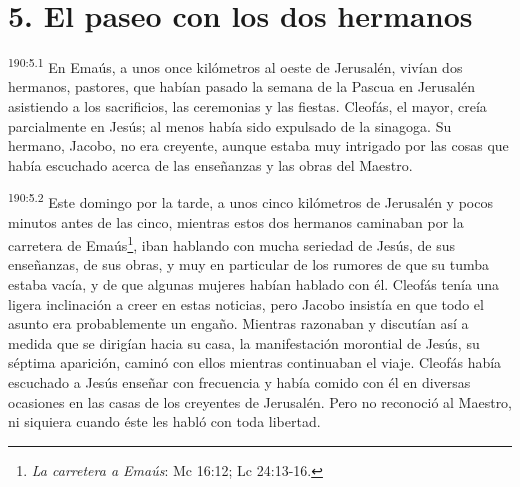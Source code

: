 \section*{5. El paseo con los dos hermanos}
\par 
\textsuperscript{190:5.1} En Emaús, a unos once kilómetros al oeste de Jerusalén, vivían dos hermanos, pastores, que habían pasado la semana de la Pascua en Jerusalén asistiendo a los sacrificios, las ceremonias y las fiestas. Cleofás, el mayor, creía parcialmente en Jesús; al menos había sido expulsado de la sinagoga. Su hermano, Jacobo, no era creyente, aunque estaba muy intrigado por las cosas que había escuchado acerca de las enseñanzas y las obras del Maestro.

\par 
\textsuperscript{190:5.2} Este domingo por la tarde, a unos cinco kilómetros de Jerusalén y pocos minutos antes de las cinco, mientras estos dos hermanos caminaban por la carretera de Emaús\footnote{\textit{La carretera a Emaús}: Mc 16:12; Lc 24:13-16.}, iban hablando con mucha seriedad de Jesús, de sus enseñanzas, de sus obras, y muy en particular de los rumores de que su tumba estaba vacía, y de que algunas mujeres habían hablado con él. Cleofás tenía una ligera inclinación a creer en estas noticias, pero Jacobo insistía en que todo el asunto era probablemente un engaño. Mientras razonaban y discutían así a medida que se dirigían hacia su casa, la manifestación morontial de Jesús, su séptima aparición, caminó con ellos mientras continuaban el viaje. Cleofás había escuchado a Jesús enseñar con frecuencia y había comido con él en diversas ocasiones en las casas de los creyentes de Jerusalén. Pero no reconoció al Maestro, ni siquiera cuando éste les habló con toda libertad.

